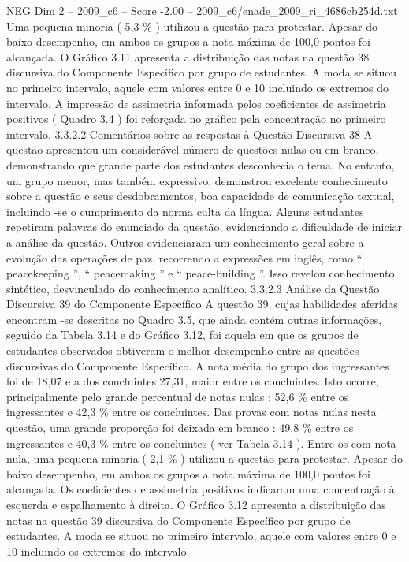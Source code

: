 \begin{textsample}{NEG Dim 2 – 2009\_c6 – Score -2.00 – 2009\_c6/enade\_2009\_ri\_4686cb254d.txt}
Uma pequena minoria ( 5,3 \% ) utilizou a questão para protestar.
Apesar do baixo desempenho, em ambos os grupos a nota máxima de 100,0 pontos foi alcançada.
O Gráfico 3.11 apresenta a distribuição das notas na questão 38 discursiva do Componente Específico por grupo de estudantes.
A moda se situou no primeiro intervalo, aquele com valores entre 0 e 10 incluindo os extremos do intervalo.
A impressão de assimetria informada pelos coeficientes de assimetria positivos ( Quadro 3.4 ) foi reforçada no gráfico pela concentração no primeiro intervalo. 3.3.2.2 Comentários sobre as respostas à Questão Discursiva 38 A questão apresentou um considerável número de questões nulas ou em branco, demonstrando que grande parte dos estudantes desconhecia o tema.
No entanto, um grupo menor, mas também expressivo, demonstrou excelente conhecimento sobre a questão e seus desdobramentos, boa capacidade de comunicação textual, incluindo -se o cumprimento da norma culta da língua.
Alguns estudantes repetiram palavras do enunciado da questão, evidenciando a dificuldade de iniciar a análise da questão.
Outros evidenciaram um conhecimento geral sobre a evolução das operações de paz, recorrendo a expressões em inglês, como “ peacekeeping ”, “ peacemaking ” e “ peace-building ”.
Isso revelou conhecimento sintético, desvinculado do conhecimento analítico. 3.3.2.3 Análise da Questão Discursiva 39 do Componente Específico A questão 39, cujas habilidades aferidas encontram -se descritas no Quadro 3.5, que ainda contém outras informações, seguido da Tabela 3.14 e do Gráfico 3.12, foi aquela em que os grupos de estudantes observados obtiveram o melhor desempenho entre as questões discursivas do Componente Específico.
A nota média do grupo dos ingressantes foi de 18,07 e a dos concluintes 27,31, maior entre os concluintes.
Isto ocorre, principalmente pelo grande percentual de notas nulas : 52,6 \% entre os ingressantes e 42,3 \% entre os concluintes.
Das provas com notas nulas nesta questão, uma grande proporção foi deixada em branco : 49,8 \% entre os ingressantes e 40,3 \% entre os concluintes ( ver Tabela 3.14 ).
Entre os com nota nula, uma pequena minoria ( 2,1 \% ) utilizou a questão para protestar.
Apesar do baixo desempenho, em ambos os grupos a nota máxima de 100,0 pontos foi alcançada.
Os coeficientes de assimetria positivos indicaram uma concentração à esquerda e espalhamento à direita.
O Gráfico 3.12 apresenta a distribuição das notas na questão 39 discursiva do Componente Específico por grupo de estudantes.
A moda se situou no primeiro intervalo, aquele com valores entre 0 e 10 incluindo os extremos do intervalo.

\end{textsample}
